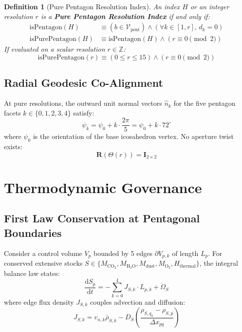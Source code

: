 \documentclass[10pt,journal,compsoc]{IEEEtran}
\begin{document}
\newtheorem{definition}{Definition}
\begin{definition}[Pure Pentagon Resolution Index]
An index $H$ or an integer resolution $r$ is a \textbf{Pure Pentagon Resolution Index} if and only if:
\begin{align}
\text{isPentagon}(H) &\equiv (b \in \mathcal{V}_{\text{pent}}) \land \left(\forall k \in [1, r], \, d_k = 0\right) \\
\text{isPurePentagon}(H) &\equiv \text{isPentagon}(H) \land (r \equiv 0 \pmod 2)
\end{align}
If evaluated on a scalar resolution $r \in \mathbb{Z}$:
\begin{equation}
\text{isPurePentagon}(r) \equiv (0 \le r \le 15) \land (r \equiv 0 \pmod 2)
\end{equation}
\end{definition}

\subsection{Radial Geodesic Co-Alignment}
At pure resolutions, the outward unit normal vectors $\hat{n}_k$ for the five pentagon facets $k \in \{0, 1, 2, 3, 4\}$ satisfy:
\begin{equation}
\psi_k = \psi_0 + k \cdot \frac{2\pi}{5} = \psi_0 + k \cdot 72^{\circ}
\end{equation}
where $\psi_0$ is the orientation of the base icosahedron vertex. No aperture twist exists:
\begin{equation}
\mathbf{R}(\Theta(r)) = \mathbf{I}_{2 \times 2}
\end{equation}

\section{Thermodynamic Governance}

\subsection{First Law Conservation at Pentagonal Boundaries}
Consider a control volume $V_p$ bounded by 5 edges $\partial V_{p,k}$ of length $L_p$. For conserved extensive stocks $S \in \{M_{\mathrm{CO_2}}, M_{\mathrm{H_2O}}, M_{\mathrm{dust}}, M_{\mathrm{O_2}}, H_{\mathrm{thermal}}\}$, the integral balance law states:
\begin{equation}
\frac{\mathrm{d}S_p}{\mathrm{d}t} = -\sum_{k=0}^{4} J_{S, k} \cdot L_{p, k} + \dot{\Omega}_S
\end{equation}
where edge flux density $J_{S, k}$ couples advection and diffusion:
\begin{equation}
J_{S, k} = v_{n, k} \bar{\rho}_{S, k} - D_S \left( \frac{\rho_{S, q_k} - \rho_{S, p}}{\Delta x_{pq}} \right)
\end{equation}
\end{document}
